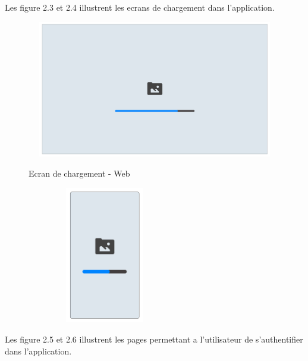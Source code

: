 Les figure 2.3 et 2.4 illustrent les ecrans de chargement dans l'application.

\begin{figure}[h!]
  \centering
  \begin{minipage}[t]{0.60\textwidth}
    \centering
    \includegraphics[width=1\textwidth, height=6cm]{chap2.images/splash web.png}
    \caption{Ecran de chargement - Web}
  \end{minipage}
  \hfill
  \begin{minipage}[t]{0.38\textwidth}
    \centering
    \includegraphics[width=0.6\textwidth, height=6cm]{chap2.images/splash mob.png}
    \caption{}
  \end{minipage}
\end{figure}


\newpage
Les figure 2.5 et 2.6 illustrent les  pages permettant a l'utilisateur de s'authentifier dans l'application.

